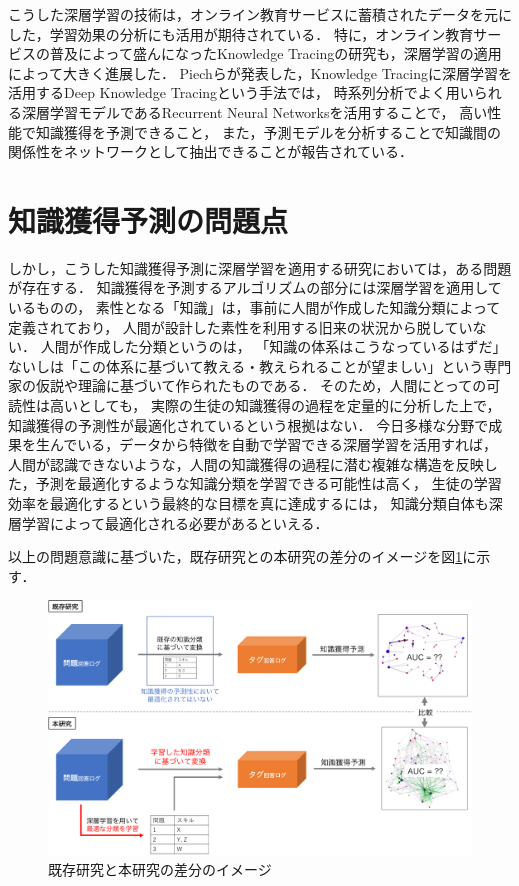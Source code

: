 こうした深層学習の技術は，オンライン教育サービスに蓄積されたデータを元にした，学習効果の分析にも活用が期待されている．
特に，オンライン教育サービスの普及によって盛んになったKnowledge Tracingの研究も，深層学習の適用によって大きく進展した．
Piechらが発表した，Knowledge Tracingに深層学習を活用するDeep Knowledge Tracingという手法では，
時系列分析でよく用いられる深層学習モデルであるRecurrent Neural Networks\cite{williams1989learning}を活用することで，
高い性能で知識獲得を予測できること，
また，予測モデルを分析することで知識間の関係性をネットワークとして抽出できることが報告されている\cite{piech2015deep}．


\section{知識獲得予測の問題点}

しかし，こうした知識獲得予測に深層学習を適用する研究においては，ある問題が存在する．
知識獲得を予測するアルゴリズムの部分には深層学習を適用しているものの，
素性となる「知識」は，事前に人間が作成した知識分類によって定義されており，
人間が設計した素性を利用する旧来の状況から脱していない．
人間が作成した分類というのは，
「知識の体系はこうなっているはずだ」ないしは「この体系に基づいて教える・教えられることが望ましい」という専門家の仮説や理論に基づいて作られたものである．
そのため，人間にとっての可読性は高いとしても，
実際の生徒の知識獲得の過程を定量的に分析した上で，知識獲得の予測性が最適化されているという根拠はない．
今日多様な分野で成果を生んでいる，データから特徴を自動で学習できる深層学習を活用すれば，
人間が認識できないような，人間の知識獲得の過程に潜む複雑な構造を反映した，予測を最適化するような知識分類を学習できる可能性は高く，
生徒の学習効率を最適化するという最終的な目標を真に達成するには，
知識分類自体も深層学習によって最適化される必要があるといえる．


以上の問題意識に基づいた，既存研究との本研究の差分のイメージを図\ref{fig:problem}に示す．
\begin{figure}[htb]
\begin{center}
\includegraphics[width=400pt]{./img/problem2.png}
\end{center}
\caption{既存研究と本研究の差分のイメージ}
\label{fig:problem}
\end{figure}


